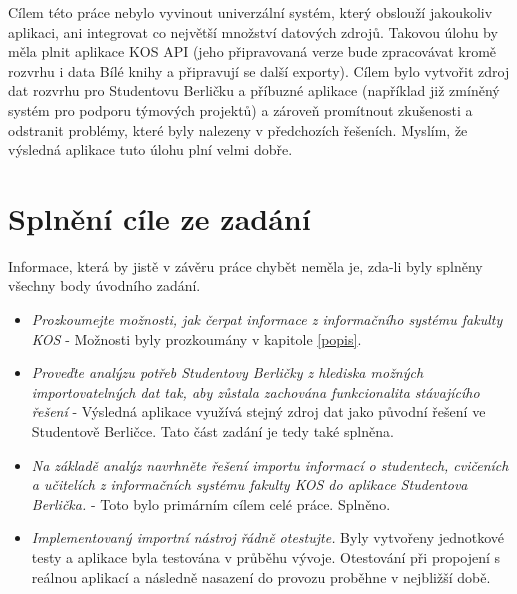 \documentclass[11pt,twoside,a4paper]{book}
\begin{document}
Cílem této práce nebylo vyvinout univerzální systém, který obslouží jakoukoliv aplikaci, ani integrovat co největší množství datových zdrojů. Takovou úlohu by měla plnit aplikace KOS API (jeho připravovaná verze bude zpracovávat kromě rozvrhu i data Bílé knihy a připravují se další exporty). Cílem bylo vytvořit zdroj dat rozvrhu pro Studentovu Berličku a příbuzné aplikace (například již zmíněný systém pro podporu týmových projektů) a zároveň promítnout zkušenosti a odstranit problémy, které byly nalezeny v předchozích řešeních. Myslím, že výsledná aplikace tuto úlohu plní velmi dobře.

\section{Splnění cíle ze zadání}
Informace, která by jistě v závěru práce chybět neměla je, zda-li byly splněny všechny body úvodního zadání.
\begin{itemize}
\item \textit{Prozkoumejte možnosti, jak čerpat informace z informačního systému fakulty KOS} - Možnosti byly prozkoumány v kapitole \ref{popis}.
\item \textit{Proveďte analýzu potřeb Studentovy Berličky z hlediska možných importovatelných dat tak, aby zůstala zachována funkcionalita stávajícího řešení} - Výsledná aplikace využívá stejný zdroj dat jako původní řešení ve Studentově Berličce. Tato část zadání je tedy také splněna.
\item \textit{Na základě analýz navrhněte řešení importu informací o studentech, cvičeních a učitelích z informačních systému fakulty KOS do aplikace Studentova Berlička.} - Toto bylo primárním cílem celé práce. Splněno.
\item \textit{Implementovaný importní nástroj řádně otestujte.} Byly vytvořeny jednotkové testy a aplikace byla testována v průběhu vývoje. Otestování při propojení s reálnou aplikací a následně nasazení do provozu proběhne v nejbližší době.
\end{itemize}


%
\end{document}
